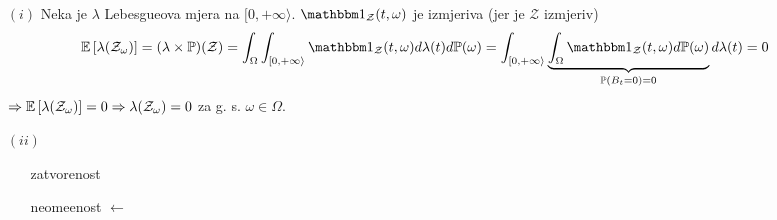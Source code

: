\documentclass{article}
\begin{document}
\begin{enumerate}
    \item[\((i)\)] Neka je \(\lambda\) Lebesgueova mjera na \([0,+\infty\rangle.\) \(\mathbbm 1_\mathcal Z(t,\omega)\) je izmjeriva (jer je \(\mathcal Z\) izmjeriv) \[\Bbb E\left[\lambda(\mathcal Z_\omega)\right]=(\lambda\times\Bbb P)(\mathcal Z)=\int_\Omega\int_{[0,+\infty\rangle}\mathbbm 1_\mathcal Z(t,\omega)d\lambda(t)d\Bbb P(\omega)=\int_{[0,+\infty\rangle}\underbrace{\int_\Omega\mathbbm 1_\mathcal Z(t,\omega)d\Bbb P(\omega)}_{\Bbb P(B_t=0)=0}d\lambda(t)=0\] \(\Rightarrow\Bbb E\left[\lambda(\mathcal Z_\omega)\right]=0\Rightarrow\lambda(\mathcal Z_\omega)=0\) za g. s. \(\omega\in\Omega.\)
    \item[\((ii)\)] \begin{enumerate}
        \item[\ding{228}] zatvorenost  
        \item[\ding{228}] neome\dj{}enost \(\leftarrow\)\begin{enumerate}

\end{enumerate}
\end{enumerate}
\end{enumerate}
\end{document}
